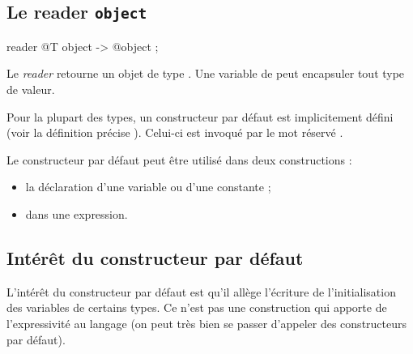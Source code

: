 \subsection{Le reader \texttt{object}}

\begin{galgascode}
reader @T object -> @object ;
\end{galgascode}


Le \emph{reader}  retourne un objet de type . Une variable de  peut encapsuler tout type de valeur.

%
%
%
%
%
%
%
%
%












Pour la plupart des types, un constructeur par défaut est implicitement défini (voir la définition précise ). Celui-ci est invoqué par le mot réservé .

Le constructeur par défaut peut être utilisé dans deux constructions :
\begin{itemize}
  \item la déclaration d'une variable ou d'une constante ;
  \item dans une expression.
\end{itemize}

\subsection{Intérêt du constructeur par défaut}


L'intérêt du constructeur par défaut est qu'il allège l'écriture de l'initialisation des variables de certains types. Ce n'est pas une construction qui apporte de l'expressivité au langage (on peut très bien se passer d'appeler des constructeurs par défaut).

